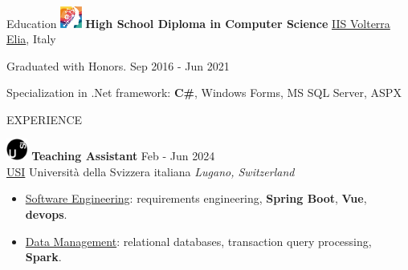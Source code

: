 \documentclass{cv} %
\def\intraexpvspace{0.15cm}
\begin{document}
\begin{minipage}[b][0.9\paperheight][t]{0.7\linewidth}
\begin{rSection}{Education}
        \includegraphics[width=0.7cm, trim={0cm 2.2cm 0cm 0cm}]{iisve-icon.png}
        {\bf High School Diploma in Computer Science}
        \hfill \href{https://www.istitutovolterraelia.it/}{IIS Volterra Elia}, Italy
        \item \hspace{0.85cm}Graduated with Honors.
        \hfill {Sep 2016 - Jun 2021}
        \item Specialization in .Net framework: \textbf{C\#}, Windows Forms, MS SQL Server, ASPX
    \end{rSection}
    \begin{rSection}{EXPERIENCE}
        \vspace{0.2cm}

        \includegraphics[width=0.7cm, trim={0cm 10cm 0cm 0cm}]{usi-icon.png}
        \hspace*{0cm}\textbf{Teaching Assistant} \hfill Feb - Jun 2024\\
        \hspace*{0.85cm}\href{https://www.usi.ch/}{USI} Università della Svizzera italiana
        \hfill \textit{Lugano, Switzerland}
        \begin{itemize}
            \item \href{https://search.usi.ch/it/corsi/35268192/software-atelier-4-software-engineering-project}{Software Engineering}:
                  requirements engineering, \textbf{Spring Boot}, \textbf{Vue}, \textbf{devops}.

            \item \href{https://search.usi.ch/it/corsi/35268184/data-management}{Data Management}:
                  relational databases, transaction query processing, \textbf{Spark}.
        \end{itemize}
        \vspace{\intraexpvspace}
        \vspace{\intraexpvspace}


\end{rSection}
\end{minipage}
\end{document}

